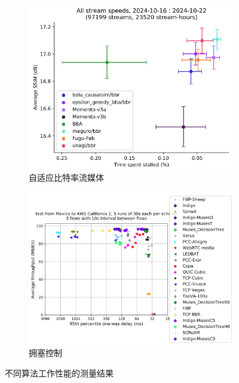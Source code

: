 \begin{figure}[ht]
\centering
\begin{subfigure}[t]{0.49\linewidth}
  \centering
  \includegraphics[width=\linewidth]{figures/chap04/algo_measurement/abr.png}
  \caption{自适应比特率流媒体}
  \label{fig-real-measurement-ABR}
\end{subfigure}%
\begin{subfigure}[t]{0.49\linewidth}
  \centering
  \includegraphics[width=\linewidth]{figures/chap04/algo_measurement/cc.png}
  \caption{拥塞控制}
  \label{fig-real-measurement-results-CC}
\end{subfigure}

\caption{不同算法工作性能的测量结果}
\label{fig:measurement-result-llmcc}
\end{figure}
